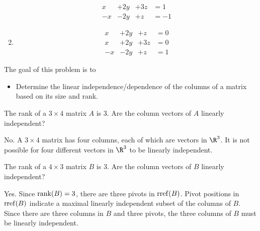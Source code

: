 \documentclass{problemset}
\newcommand{\bookonlynewpage}{\begin{bookonly}\newpage\end{bookonly}}
\begin{document}
\begin{parts}
\begin{solution}
\begin{enumerate}
\begin{equation*}
\begin{array}{llll}
								x&+2y&+3z &= 1\\
								-x&-2y&+z &= -1
							\end{array}
						\end{equation*}
					\item
						\begin{equation*}
							\begin{array}{llll}
								x&+2y&+z &= 0\\
								x&+2y&+3z &= 0\\
								-x&-2y&+z &= 1
							\end{array}
						\end{equation*}
				\end{enumerate}
			\end{solution}
	\end{parts}

	\bookonlynewpage
	\question
	\begin{annotation}
		\begin{goals}

			The goal of this problem is to
			\begin{itemize}
				\item Determine the linear independence/dependence of the columns of a matrix
					based on its size and rank.
			\end{itemize}
		\end{goals}
	\end{annotation}
	\begin{parts}
		\item The rank of a $3\times 4$ matrix $A$ is $3$.
			Are the column vectors of $A$ linearly independent?
			\begin{solution}
				No. A $3 \times 4$ matrix has four columns, each of which are
				vectors in $\R^3$. It is not possible for four different vectors
				in $\R^3$ to be linearly independent.
			\end{solution}
		\item The rank of a $4\times 3$ matrix $B$ is $3$.
			Are the column vectors of $B$ linearly independent?
			\begin{solution}
				Yes. Since $\operatorname{rank}(B)=3$, there are three pivots in $\operatorname{rref}(B)$.
				Pivot positions in $\operatorname{rref}(B)$ indicate a maximal linearly
				independent subset of the columns of $B$. Since there are three
				columns in $B$ and three pivots, the three columns of $B$ must be
				linearly independent.
			\end{solution}
	\end{parts}
\end{document}
